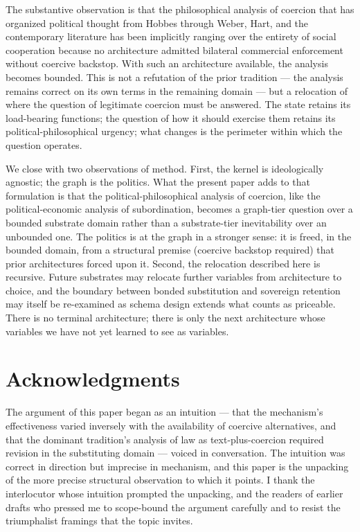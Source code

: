 \documentclass[11pt,a4paper]{article}
\theoremstyle{remark}
\begin{document}
The substantive observation is that the philosophical analysis
of coercion that has organized political thought from Hobbes
through Weber, Hart, and the contemporary literature has been
implicitly ranging over the entirety of social cooperation
because no architecture admitted bilateral commercial
enforcement without coercive backstop. With such an architecture
available, the analysis becomes bounded. This is not a refutation
of the prior tradition --- the analysis remains correct on its
own terms in the remaining domain --- but a relocation of where
the question of legitimate coercion must be answered. The state
retains its load-bearing functions; the question of how it
should exercise them retains its political-philosophical
urgency; what changes is the perimeter within which the
question operates.

We close with two observations of method. First, the kernel is
ideologically agnostic; the graph is the politics.
What the present paper adds to that formulation is that the
political-philosophical analysis of coercion, like the
political-economic analysis of subordination, becomes a
graph-tier question over a bounded substrate domain rather than
a substrate-tier inevitability over an unbounded one. The
politics is at the graph in a stronger sense: it is freed, in
the bounded domain, from a structural premise (coercive backstop
required) that prior architectures forced upon it. Second, the
relocation described here is recursive. Future substrates may
relocate further variables from architecture to choice, and the
boundary between bonded substitution and sovereign retention may
itself be re-examined as schema design extends what counts as
priceable. There is no terminal architecture; there is only the
next architecture whose variables we have not yet learned to see
as variables.

\section*{Acknowledgments}
The argument of this paper began as an intuition --- that the
mechanism's effectiveness varied inversely with the availability
of coercive alternatives, and that the dominant tradition's
analysis of law as text-plus-coercion required revision in the
substituting domain --- voiced in conversation. The intuition
was correct in direction but imprecise in mechanism, and this
paper is the unpacking of the more precise structural observation
to which it points. I thank the interlocutor whose intuition
prompted the unpacking, and the readers of earlier drafts who
pressed me to scope-bound the argument carefully and to resist
the triumphalist framings that the topic invites.
\end{document}

